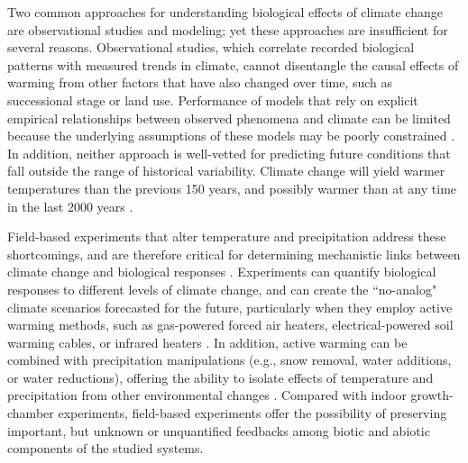 \documentclass{article}
\begin{document}
\par Two common approaches for understanding biological effects of climate change are observational studies and modeling; yet these approaches are insufficient for several reasons. Observational studies, which correlate recorded biological patterns with measured trends in climate, cannot disentangle the causal effects of warming from other factors that have also changed over time, such as successional stage or land use. Performance of models that rely on explicit empirical relationships between observed phenomena and climate can be limited because the underlying assumptions of these models may be poorly constrained \citep [e.g.,][]{pearson2004,ibanez2006,swab2012,chuine2016}. 
In addition, neither approach is well-vetted for predicting future conditions that fall outside the range of historical variability. Climate change will yield warmer temperatures than the previous 150 years, and possibly warmer than at any time in the last 2000 years \citep{ohlemuller2006,williams2007,williams2007b,ipcc2013}.  

\par Field-based experiments that alter temperature and precipitation address these shortcomings, and are therefore critical for determining mechanistic links between climate change and biological responses \citep[e.g.,][]{box1978,williams2007,gelman2014}. Experiments can quantify biological responses to different levels of climate change, and can create the ``no-analog" climate scenarios forecasted for the future, particularly when they employ active warming methods, such as gas-powered forced air heaters, electrical-powered soil warming cables, or infrared heaters \citep{shaver2000,williams2007b,aronson2009}. In addition, active warming can be combined with precipitation manipulations (e.g., snow removal, water additions, or water reductions), offering the ability to isolate effects of temperature and precipitation from other environmental changes \citep [e.g.,][]{price1998,cleland2006,sherry2007,rollinson2012}. %
Compared with indoor growth-chamber experiments, field-based experiments offer the possibility of preserving important, but unknown or unquantified feedbacks among biotic and abiotic components of the studied systems. 
\end{document}
